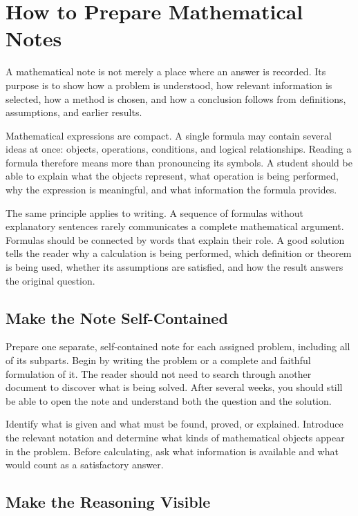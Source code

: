 \section{How to Prepare Mathematical Notes}

A mathematical note is not merely a place where an answer is recorded. Its
purpose is to show how a problem is understood, how relevant information is
selected, how a method is chosen, and how a conclusion follows from
definitions, assumptions, and earlier results.

Mathematical expressions are compact. A single formula may contain several
ideas at once: objects, operations, conditions, and logical relationships.
Reading a formula therefore means more than pronouncing its symbols. A student
should be able to explain what the objects represent, what operation is being
performed, why the expression is meaningful, and what information the formula
provides.

The same principle applies to writing. A sequence of formulas without
explanatory sentences rarely communicates a complete mathematical argument.
Formulas should be connected by words that explain their role. A good solution
tells the reader why a calculation is being performed, which definition or
theorem is being used, whether its assumptions are satisfied, and how the
result answers the original question.

\subsection{Make the Note Self-Contained}

Prepare one separate, self-contained note for each assigned problem, including
all of its subparts. Begin by writing the problem or a complete and faithful
formulation of it. The reader should not need to search through another
document to discover what is being solved. After several weeks, you should
still be able to open the note and understand both the question and the
solution.

Identify what is given and what must be found, proved, or explained. Introduce
the relevant notation and determine what kinds of mathematical objects appear
in the problem. Before calculating, ask what information is available and what
would count as a satisfactory answer.

\subsection{Make the Reasoning Visible}

